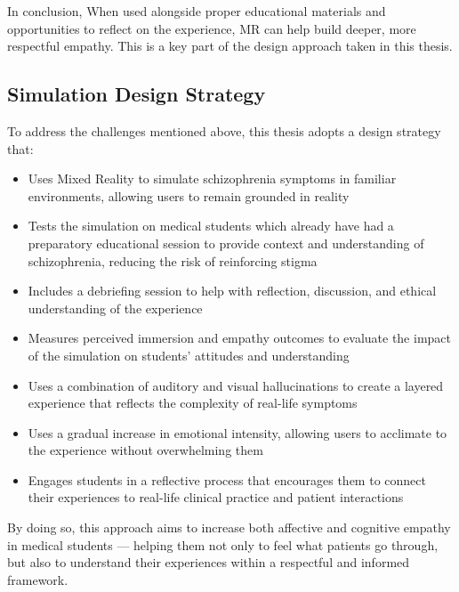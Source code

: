 In conclusion, When used alongside proper educational materials and opportunities to reflect on the experience, MR can help build deeper, more respectful empathy. This is a key part of the design approach taken in this thesis.


\subsection{Simulation Design Strategy}
To address the challenges mentioned above, this thesis adopts a design strategy that:

\begin{itemize}
    \item Uses Mixed Reality to simulate schizophrenia symptoms in familiar environments, allowing users to remain grounded in reality
    \item Tests the simulation on medical students which already have had a preparatory educational session to provide context and understanding of schizophrenia, reducing the risk of reinforcing stigma
    \item Includes a debriefing session to help with reflection, discussion, and ethical understanding of the experience
    \item Measures perceived immersion and empathy outcomes to evaluate the impact of the simulation on students' attitudes and understanding
    \item Uses a combination of auditory and visual hallucinations to create a layered experience that reflects the complexity of real-life symptoms
    \item Uses a gradual increase in emotional intensity, allowing users to acclimate to the experience without overwhelming them
    \item Engages students in a reflective process that encourages them to connect their experiences to real-life clinical practice and patient interactions
\end{itemize}

By doing so, this approach aims to increase both affective and cognitive empathy in medical students — helping them not only to feel what patients go through, but also to understand their experiences within a respectful and informed framework.



